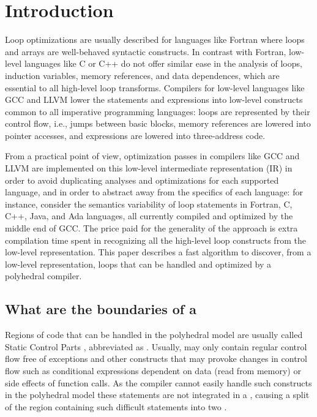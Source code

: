 \documentclass{sig-alternate}
\begin{document}
\section{Introduction}

Loop optimizations are usually described for languages like Fortran where loops
and arrays are well-behaved syntactic constructs.  In contrast with Fortran,
low-level languages like C or C++ do not offer similar ease in the analysis of
loops, induction variables, memory references, and data dependences, which are
essential to all high-level loop transforms.  Compilers for low-level languages
like GCC and LLVM lower the statements and expressions into low-level constructs
common to all imperative programming languages: loops are represented by their
control flow, i.e., jumps between basic blocks, memory references are lowered
into pointer accesses, and expressions are lowered into three-address code.

From a practical point of view, optimization passes in compilers like GCC and
LLVM are implemented on this low-level intermediate representation (IR) in order
to avoid duplicating analyses and optimizations for each supported language, and
in order to abstract away from the specifics of each language: for instance,
consider the semantics variability of loop statements in Fortran, C, C++, Java,
and Ada languages, all currently compiled and optimized by the middle end of
GCC.  The price paid for the generality of the approach is extra compilation
time spent in recognizing all the high-level loop constructs from the low-level
representation.  This paper describes a fast algorithm to discover, from a
low-level representation, loops that can be handled and optimized by a
polyhedral compiler.

\subsection{What are the boundaries of a }

Regions of code that can be handled in the polyhedral model are usually called
Static Control Parts \cite{Girbal,Bondhugula}, abbreviated as .  Usually,
 may only contain regular control flow free of exceptions and other
constructs that may provoke changes in control flow such as conditional
expressions dependent on data (read from memory) or side effects of function
calls.  As the compiler cannot easily handle such constructs in the polyhedral
model these statements are not integrated in a \SCoP{}, causing a split of the
region containing such difficult statements into two .
\end{document}
